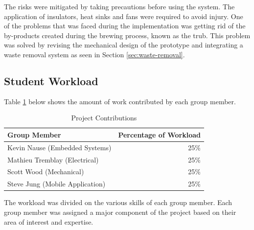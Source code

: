 \documentclass{article}
\begin{document}
The risks were mitigated by taking precautions before using the system. The application of insulators, heat sinks and fans were required to avoid injury.  One of the problems that was faced during the implementation was getting rid of the by-products created during the brewing process, known as the \gls{trub}.  This problem was solved by revising the mechanical design of the prototype and integrating a waste removal system as seen in Section \ref{sec:waste-removal}.

\subsection{Student Workload}
Table \ref{tab:workload-percentage} below shows the amount of work contributed by each group member.
\begin{table}[H]
\centering
\caption{Project Contributions}
\label{tab:workload-percentage}
\begin{tabular}{lr}
\toprule
\textbf{Group Member} 	& \textbf{Percentage of Workload}\\ 
\midrule
Kevin Nause (Embedded Systems)		&        25\%               \\
Mathieu Tremblay (Electrical)		&        25\%               \\
Scott Wood (Mechanical)				&        25\%               \\
Steve Jung (Mobile Application)		& 		 25\%				\\
\bottomrule
\end{tabular}
\end{table}

The workload was divided on the various skills of each group member. Each group member was assigned a major component of the project based on their area of interest and expertise. 

\pagebreak

\printglossary[type=acronym]
\printglossary[type=beer]
\printglossary[type=technical]

\pagebreak

{}


\pagebreak
\end{document}
